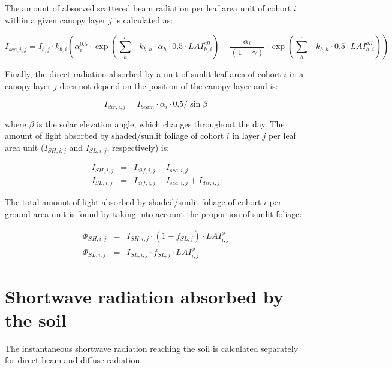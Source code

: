\documentclass[]{book}
\begin{document}
The amount of absorved scattered beam radiation per leaf area unit of
cohort \(i\) within a given canopy layer \(j\) is calculated as:

\begin{equation}
I_{sca,i,j} = I_{b,j} \cdot k_{b,i} \left( \alpha_i^{0.5}\cdot \exp \left( \sum_{h}^{c}{-k_{b,h}\cdot \alpha_h\cdot 0.5\cdot LAI^{all}_{h,i}}\right) 
-\frac{\alpha_i}{(1-\gamma)}\cdot \exp\left( \sum_{h}^{c}{-k_{b,h}\cdot 0.5\cdot LAI^{all}_{h,i}}\right) \right)
\end{equation}

Finally, the direct radiation absorbed by a unit of sunlit leaf area of
cohort \(i\) in a canopy layer \(j\) does not depend on the position of
the canopy layer and is:

\begin{equation}
I_{dir,i,j} = I_{beam} \cdot \alpha_i \cdot 0.5/\sin{\beta}
\end{equation}

where \(\beta\) is the solar elevation angle, which changes throughout
the day. The amount of light absorbed by shaded/sunlit foliage of cohort
\(i\) in layer \(j\) per leaf area unit (\(I_{SH,i,j}\) and
\(I_{SL,i,j}\), respectively) is:

\begin{eqnarray}
I_{SH,i,j} &=& I_{dif,i,j} + I_{sca,i,j} \\
I_{SL,i,j} &=& I_{dif,i,j} + I_{sca,i,j} + I_{dir,i,j}
\end{eqnarray}

The total amount of light absorbed by shaded/sunlit foliage of cohort
\(i\) per ground area unit is found by taking into account the
proportion of sunlit foliage:

\begin{eqnarray}
\Phi_{SH,i,j} &=& I_{SH,i,j}\cdot (1 - f_{SL,j}) \cdot LAI^{\phi}_{i,j}\\
\Phi_{SL,i,j} &=& I_{SL,i,j}\cdot f_{SL,j} \cdot LAI^{\phi}_{i,j}
\end{eqnarray}

\section{Shortwave radiation absorbed by the
soil}\label{shortwave-radiation-absorbed-by-the-soil}

The instantaneous shortwave radiation reaching the soil is calculated
separately for direct beam and diffuse radiation:
\end{document}
